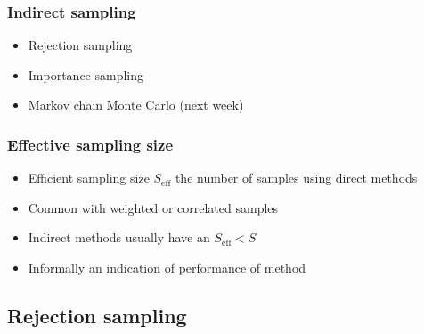\documentclass[10pt]{beamer}
\begin{document}
\begin{frame}

\frametitle{Indirect sampling}

  \begin{itemize}
  \item Rejection sampling
  \item Importance sampling
  \item Markov chain Monte Carlo (next week)
  \end{itemize}

\end{frame}

\begin{frame}

\frametitle{Effective sampling size}

  \begin{itemize}
    \item Efficient sampling size $S_\text{eff}$ the number of samples using direct methods
    \item Common with {\color{uured} weighted} or {\color{uured} correlated} samples
    \pause
    \item Indirect methods usually have an $S_\text{eff} < S$
    \item Informally an indication of performance of method
  \end{itemize}

\end{frame}

\subsection{Rejection sampling}
\end{document}
